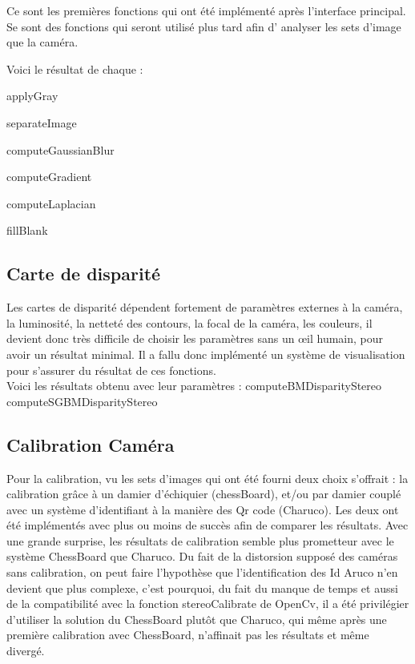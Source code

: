 \documentclass{article}
\begin{document}

Ce sont les premières fonctions qui ont été implémenté après l'interface principal. Se sont des fonctions qui seront utilisé plus tard  afin d' analyser les sets d'image que la caméra.

Voici le résultat de chaque :

applyGray

separateImage

computeGaussianBlur

computeGradient

computeLaplacian

fillBlank


\newpage
\subsection{Carte de disparité}


Les cartes de disparité dépendent fortement de paramètres externes à la caméra, la luminosité, la netteté des contours, la focal de la caméra, les couleurs, il devient donc très difficile de choisir les paramètres sans un œil humain, pour avoir un résultat minimal. Il a fallu donc implémenté un système de visualisation pour s'assurer du résultat de ces fonctions.\\

Voici les résultats obtenu avec leur paramètres :
    computeBMDisparityStereo
    computeSGBMDisparityStereo

\newpage
\subsection{Calibration Caméra}


Pour la calibration, vu les sets d'images qui ont été fourni deux choix s'offrait : la calibration grâce à un damier d'échiquier (chessBoard), et/ou par damier couplé avec un système d'identifiant à la manière des Qr code (Charuco). 
Les deux ont été implémentés avec plus ou moins de succès afin de comparer les résultats.
Avec une grande surprise, les résultats de calibration semble plus prometteur avec le système ChessBoard que Charuco.
Du fait de la distorsion supposé des caméras sans calibration, on peut faire l’hypothèse que l'identification des Id Aruco n'en devient que plus complexe, c'est pourquoi, du fait du manque de temps et aussi de la compatibilité avec la fonction stereoCalibrate de OpenCv, il a été privilégier d'utiliser la solution du ChessBoard plutôt que Charuco, qui même après une première calibration avec ChessBoard, n'affinait pas les résultats et même divergé.
\end{document}
